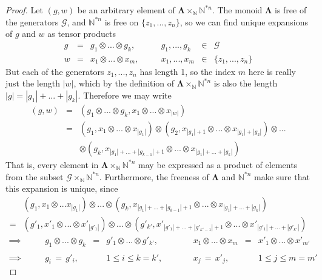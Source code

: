 \documentclass{amsbook} %
\newcommand{\ML}{\mathbf{\Lambda}}
\numberwithin{section}{chapter}
\begin{document}
\begin{proof}
Let $(g, w)$ be an arbitrary element of $\ML \times_{\mathbb{N}} \mathbb{N}^{\ast n}$. The monoid $\ML$ is free of the generators $\mathcal{G}$, and $\mathbb{N}^{\ast n}$ is free on $\{z_1, ..., z_n\}$, so we can find unique expansions of $g$ and $w$ as tensor products
\[ \begin{array}{rclcrcl}
			g & = & g_1 \otimes ... \otimes g_k, & \quad & g_1, ..., g_k & \in & \mathcal{G} \\
			w & = & x_1 \otimes ... \otimes x_m, & \quad & x_1, ..., x_m & \in & \{z_1, ..., z_n\}
		\end{array}
\]
But each of the generators $z_1, ..., z_n$ has length 1, so the index $m$ here is really just the length $|w|$, which by the definition of $\ML \times_{\mathbb{N}} \mathbb{N}^{\ast n}$ is also the length $|g| = |g_1| + ... + |g_k|$. Therefore we may write
\[ \begin{array}{rll}
			(g, w) & = & (g_1 \otimes ... \otimes g_k, x_1 \otimes ... \otimes x_{|w|}) \\
			& = & (g_1, x_1 \otimes ... \otimes x_{|g_1|}) \otimes (g_2, x_{|g_1|+1} \otimes ... \otimes x_{|g_1|+|g_2|}) \otimes ... \\
			& & \otimes (g_k, x_{|g_1| + ... + |g_{k-1}|+1} \otimes ... \otimes x_{|g_1| + ... + |g_k|})
		\end{array}
\]
That is, every element in $\ML \times_{\mathbb{N}} \mathbb{N}^{\ast n}$ may be expressed as a product of elements from the subset $\mathcal{G} \times_{\mathbb{N}} \mathbb{N}^{\ast n}$. Furthermore, the freeness of $\ML$ and $\mathbb{N}^{\ast n}$ make sure that this expansion is unique, since
\[ \begin{array}{rl}
			& (g_1, x_1 \otimes ... x_{|g_1|}) \otimes ... \otimes (g_k, x_{|g_1| + ... + |g_{k-1}|+1} \otimes ... \otimes x_{|g_1| + ... + |g_k|}) \\
			= & (g'_1, x'_1 \otimes ... \otimes x'_{|g'_1|}) \otimes ... \otimes (g'_{k'}, x'_{|g'_1| + ... + |g'_{k'-1}|+1} \otimes ... \otimes x'_{|g'_1| + ... + |g'_{k'}|})
		\end{array}
\]
\[ \begin{array}{rcclcccl}
			\implies \quad \quad & g_1 \otimes ... \otimes g_k & = & g'_1 \otimes ... \otimes g'_{k'}, & \quad \quad & x_1 \otimes ... \otimes x_{m} & = & x'_1 \otimes ... \otimes x'_{m'} \\
			& & & & & & & \\
			\implies \quad \quad & g_i \, = \, g'_i, & & 1 \le i \le k = k', & \quad \quad & x_j \, = \, x'_j, & & 1 \le j \le m = m' 

\end{array}\]
\end{proof}
\end{document}
